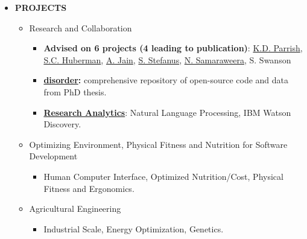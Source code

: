 \documentclass{article}
\begin{document}
    \begin{itemize}

      \item \textbf{PROJECTS}
        \begin{itemize}

          \item Research and Collaboration
            \begin{itemize}

              \item \textbf{Advised on 6 projects (4 leading to publication)}: \href{http://ntpl.me.cmu.edu/publications.html}{K.D. Parrish}, \href{https://tspace.library.utoronto.ca/bitstream/1807/42871/1/Huberman_Samuel_C_201311_MASc_thesis.pdf}{S.C. Huberman}, \href{http://blogs.ubc.ca/amerimech2014/files/2014/04/ameritech_mcgaughey_apr14.pdf}{A. Jain}, \href{http://jasonlarkin.github.io/pub.html}{S. Stefanus}, \href{http://www.abi.auckland.ac.nz/people/ksam962}{N. Samaraweera}, S. Swanson

             \item \textbf{\href{https://github.com/jasonlarkin/disorder}{disorder}:} comprehensive repository of open-source code and data from PhD thesis. 

             \item \textbf{\href{https://github.com/jasonlarkin/gedit-research}{Research Analytics}}: Natural Language Processing, IBM Watson Discovery. 

               

            \end{itemize}

          \item Optimizing Environment, Physical Fitness and Nutrition for Software Development
            \begin{itemize}
              \item Human Computer Interface, Optimized Nutrition/Cost, Physical Fitness and Ergonomics.
            \end{itemize}

          \item Agricultural Engineering
            \begin{itemize}
              \item Industrial Scale, Energy Optimization, Genetics.
            \end{itemize}


\end{itemize}
\end{itemize}
\end{document}
